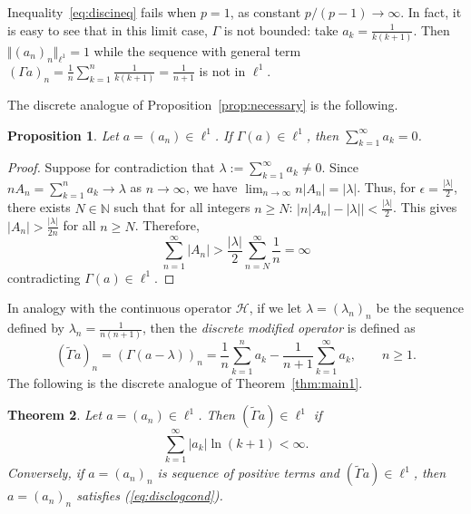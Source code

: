 \documentclass[12pt,a4paper]{amsart}
\newtheorem{theorem}{Theorem}[section]
\newtheorem{proposition}[theorem]{Proposition}
\theoremstyle{definition}
\begin{document}
Inequality~\eqref{eq:discineq} fails when $p=1$, as constant 
$p/(p-1)\to\infty$. In fact, it is easy to see that in this limit case, $\Gamma$ is not bounded: take $a_k=\frac{1}{k(k+1)}$. Then $\Vert (a_n)_n\Vert_{\ell^1}=1$ while the sequence with general term $\left(\Gamma a\right)_n=\frac{1}{n}\sum_{k=1}^n\frac{1}{k(k+1)}=\frac{1}{n+1}$ is not in $\ell^1$. 

The discrete analogue of Proposition~\ref{prop:necessary}
is the following.

\begin{proposition}\label{prop:disNec}
Let $a=(a_n)\in\ell^1$.  If $\Gamma(a) \in \ell^1$,
then $\displaystyle\sum_{k=1}^\infty a_k = 0$.
\end{proposition}

\begin{proof}
Suppose for contradiction that $\lambda:=\displaystyle\sum_{k=1}^{\infty}a_{k}\ne 0$. Since $nA_{n}=\displaystyle\sum_{k=1}^{n}a_{k}\rightarrow\lambda$ as $n\to\infty$, we have $\displaystyle\lim_{n\rightarrow\infty}n|A_{n}|=|\lambda|$. Thus, for $\epsilon=\frac{|\lambda|}{2}$, there exists $N\in\mathbb{N}$ such that for all integers $n\ge N$: $\left|n|A_{n}|-|\lambda|\right|<\frac{|\lambda|}{2}$. This gives $|A_{n}|>\frac{|\lambda|}{2n}$ for all $n\geq N$. Therefore,
    \begin{equation}
        \displaystyle\sum_{n=1}^{\infty}|A_{n}|>\frac{|\lambda|}{2}\sum_{n=N}^{\infty}\frac{1}{n}=\infty
    \end{equation}
contradicting $\Gamma (a)\in\ell^1$.
\end{proof}



In analogy with the continuous operator $\mathcal{H}$, if we let $\lambda=(\lambda_n)_n$ be the sequence defined by $\lambda_n=\frac{1}{n(n+1)}$, then the \emph{discrete modified operator} is defined as
\begin{equation}\label{eq:discH}
  (\tilde{\Gamma}a)_n
  =\left(\Gamma(a-\lambda)\right)_n= \frac{1}{n}\sum_{k=1}^n a_k
    - \frac{1}{n+1}\sum_{k=1}^\infty a_k,
  \qquad n\ge 1.
\end{equation}
The following is the discrete analogue of Theorem~\ref{thm:main1}.

\begin{theorem}\label{thm:main2}
Let $a=(a_n)\in\ell^1$.  Then $(\tilde{\Gamma}a)\in\ell^1$ if 
\begin{equation}\label{eq:disclogcond}
  \sum_{k=1}^\infty |a_k|\ln(k+1) < \infty.
\end{equation}
Conversely, if $a=(a_n)_n$ is sequence of positive terms and $(\tilde{\Gamma}a)\in\ell^1$, then $a=(a_n)_n$ satisfies (\ref{eq:disclogcond}).
\end{theorem}
\end{document}
